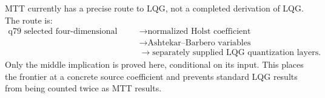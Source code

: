 \documentclass[11pt]{article}
\theoremstyle{plain}
\begin{document}
MTT currently has a precise route to LQG, not a completed derivation of LQG.
The route is:
\[
\begin{aligned}
 \text{q79 selected four-dimensional action}
 &\longrightarrow \text{normalized Holst coefficient}\\
 &\longrightarrow \text{Ashtekar--Barbero variables}\\
 &\longrightarrow \text{separately supplied LQG quantization layers}.
\end{aligned}
\]
Only the middle implication is proved here, conditional on its input. This
places the frontier at a concrete source coefficient and prevents standard
LQG results from being counted twice as MTT results.



\end{document}

